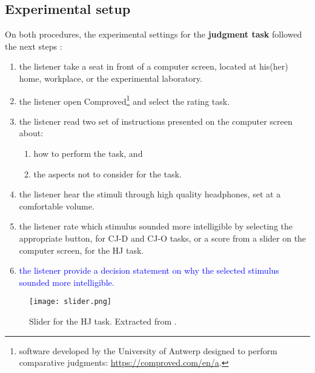 \subsection{Experimental setup}
%
On both procedures, the experimental settings for the \textbf{judgment task} followed the next steps \citep{Boonen_et_al_2020, Boonen_et_al_2021}:
%
\begin{enumerate} \itemsep1pt
	\item the listener take a seat in front of a computer screen, located at his(her) home, workplace, or the experimental laboratory.
	\item the listener open Comproved\footnote{software developed by the University of Antwerp designed to perform comparative judgments: \url{https://comproved.com/en/a}.} and select the rating task.
	\item the listener read two set of instructions presented on the computer screen about:
	\begin{enumerate}
		\item how to perform the task, and
		\item the aspects not to consider for the task.
	\end{enumerate}
	\item the listener hear the stimuli through high quality headphones, set at a comfortable volume.
	\item the listener rate which stimulus sounded more intelligible by selecting the appropriate button, for CJ-D and CJ-O tasks, or a score from a slider on the computer screen, for the HJ task.
	\item \textcolor{blue}{the listener provide a decision statement on why the selected stimulus sounded more intelligible.}
\end{enumerate}
%
\begin{figure}[h]
	\centering
	\texttt{[image: slider.png]}
	\caption[Slider for the HJ task.]%
	{Slider for the HJ task. Extracted from \citet{Boonen_et_al_2021}.}
	\label{fig:slider}
\end{figure}
%
